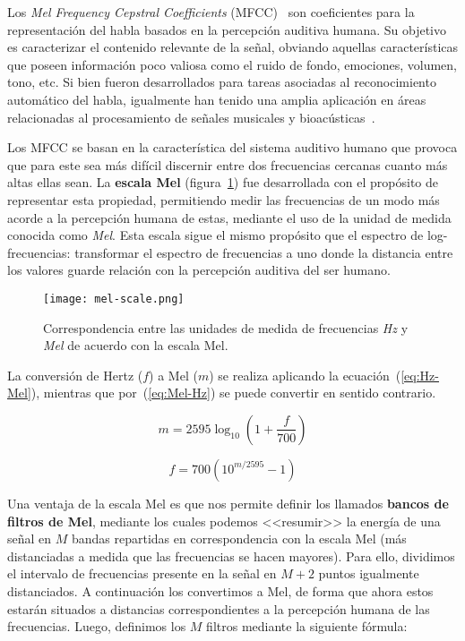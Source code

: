 Los \textit{Mel Frequency Cepstral Coefficients} (MFCC)~\cite{Davis80} son coeficientes para la representación del habla basados en la percepción auditiva humana.
Su objetivo es caracterizar el contenido relevante de la señal, obviando aquellas características que poseen información poco valiosa como el ruido de fondo, emociones, volumen, tono, etc.
Si bien fueron desarrollados para tareas asociadas al reconocimiento automático del habla, igualmente han tenido una amplia aplicación en áreas relacionadas al procesamiento de señales musicales y bioacústicas~\cite{McKinney03,Dufour14,Clemins05,Lee06,Li01,Cowling03,Mitrovic06,Fagerlund07}.

Los MFCC se basan en la característica del sistema auditivo humano que provoca que para este sea más difícil discernir entre dos frecuencias cercanas cuanto más altas ellas sean.
La \textbf{escala Mel} (figura~\ref{img:mel-scale}) fue desarrollada con el propósito de representar esta propiedad, permitiendo medir las frecuencias de un modo más acorde a la percepción humana de estas, mediante el uso de la unidad de medida conocida como \textit{Mel}.
Esta escala sigue el mismo propósito que el espectro de log-frecuencias: transformar el espectro de frecuencias a uno donde la distancia entre los valores guarde relación con la percepción auditiva del ser humano.

\begin{figure}[!h]
    \centering
    \texttt{[image: mel-scale.png]}
    \caption{Correspondencia entre las unidades de medida de frecuencias \textit{Hz} y \textit{Mel} de acuerdo con la escala Mel.}
    \label{img:mel-scale}
\end{figure}

La conversión de Hertz ($f$) a Mel ($m$) se realiza aplicando la ecuación~(\ref{eq:Hz-Mel}), mientras que por~(\ref{eq:Mel-Hz}) se puede convertir en sentido contrario.

\begin{equation}
    \label{eq:Hz-Mel}
    m = 2595\log_{10}\left( 1 + \frac{f}{700} \right)
\end{equation}

\begin{equation}
    \label{eq:Mel-Hz}
    f = 700\left( 10^{m/2595} - 1 \right)
\end{equation}

Una ventaja de la escala Mel es que nos permite definir los llamados \textbf{bancos de filtros de Mel}, mediante los cuales podemos <<resumir>> la energía de una señal en $M$ bandas repartidas en correspondencia con la escala Mel (más distanciadas a medida que las frecuencias se hacen mayores).
Para ello, dividimos el intervalo de frecuencias presente en la señal en $M+2$ puntos igualmente distanciados.
A continuación los convertimos a Mel, de forma que ahora estos estarán situados a distancias correspondientes a la percepción humana de las frecuencias.
Luego, definimos los $M$ filtros mediante la siguiente fórmula:

